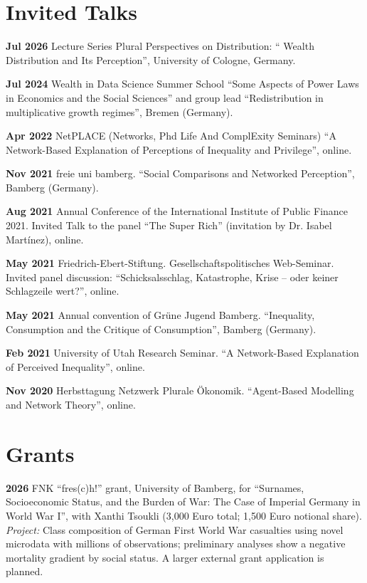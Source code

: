 \documentclass[margin]{res}
\begin{document}
\begin{resume}
	\section{Invited Talks} 
	\textbf{Jul 2026} Lecture Series Plural Perspectives on Distribution: `` Wealth Distribution and Its Perception'', University of Cologne, Germany.
	
	\textbf{Jul 2024} Wealth in Data Science Summer School ``Some Aspects of Power Laws in Economics and the Social Sciences'' and group lead ``Redistribution in multiplicative growth regimes'', Bremen (Germany).
	
	\textbf{Apr 2022} NetPLACE (Networks, Phd Life And ComplExity Seminars) ``A Network-Based Explanation of Perceptions of Inequality and Privilege'', online.
	
	\textbf{Nov 2021} freie uni bamberg. ``Social Comparisons and Networked Perception'', Bamberg (Germany).
	
	\textbf{Aug 2021} Annual Conference of the International Institute of Public Finance 2021. Invited Talk to the panel ``The Super Rich'' (invitation by Dr. Isabel Mart\'inez), online.
	
	\textbf{May 2021} Friedrich-Ebert-Stiftung. Gesellschaftspolitisches Web-Seminar. Invited panel discussion: ``Schicksalsschlag, Katastrophe, Krise -- oder keiner Schlagzeile wert?'', online.
	
	
	\textbf{May 2021} Annual convention of Gr\"une Jugend Bamberg. ``Inequality, Consumption and the Critique of Consumption'', Bamberg (Germany).
	
	\textbf{Feb 2021} University of Utah Research Seminar. ``A Network-Based Explanation of Perceived Inequality'', online.
	
	\textbf{Nov 2020} Herbsttagung Netzwerk Plurale \"Okonomik. ``Agent-Based Modelling and Network Theory'', online.
	
	\newpage
	\section{Grants}
	\textbf{2026} FNK ``fres(c)h!'' grant, University of Bamberg, for ``Surnames, Socioeconomic Status, and the Burden of War: The Case of Imperial Germany in World War I'', with Xanthi Tsoukli (3,000 Euro total; 1,500 Euro notional share). \textit{Project:} Class composition of German First World War casualties using novel microdata with millions of observations; preliminary analyses show a negative mortality gradient by social status. A larger external grant application is planned.
	

\end{resume}
\end{document}
